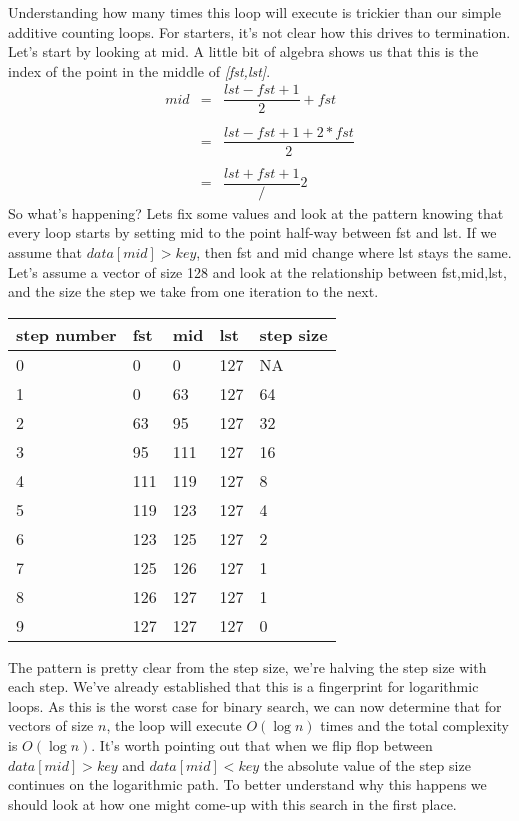 \documentclass[]{tufte-handout}
\begin{document}
Understanding how many times this loop will execute is trickier than our simple additive counting loops. For starters, it's not clear how this drives to termination. Let's start by looking at mid.  A little bit of algebra shows us that this is the index of the point in the middle of \textit{[fst,lst]}.
\[
\begin{array}{rcl}
mid &=&  \dfrac{lst-fst+1}{2} + fst \\ \\ 
 &=& \dfrac{lst-fst+1+2*fst}{2} \\ \\
 &=& \dfrac{lst+fst+1}/2 
 \end{array}
\]
So what's happening? Lets fix some values and look at the pattern knowing that every loop starts by setting mid to the point half-way between fst and lst. If we assume that  $data[mid] > key$, then fst and mid change where lst stays the same.  Let's assume a vector of size 128 and look at the relationship between fst,mid,lst, and the size the step we take from one iteration to the next.

\begin{tabular}{lllll}
step number & fst & mid & lst & step size \\ \hline
0 & 0 & 0 & 127 & NA\\
1 & 0 & 63 & 127 & 64 \\ 
2 & 63 & 95  & 127 & 32\\ 
3 & 95 & 111 & 127 & 16 \\
4 & 111 & 119 & 127 & 8  \\
5 & 119 & 123 & 127 & 4 \\
6 & 123 & 125 & 127 & 2\\
7 & 125 & 126 & 127 & 1\\
8 & 126 & 127 & 127 & 1\\
9 & 127 & 127 & 127 & 0\\
\end{tabular}

The pattern is pretty clear from the step size, we're halving the step size with each step. We've already established that this is a fingerprint for logarithmic loops. As this is the worst case for binary search, we can now determine that for vectors of size $n$, the loop will execute $O(\log{n})$ times and the total complexity is $O(\log{n})$.  It's worth pointing out that when we flip flop between  $data[mid] > key$ and  $data[mid] < key$ the absolute value of the step size continues on the logarithmic path. To better understand why this happens we should look at how one might come-up with this search in the first place.
\end{document}
